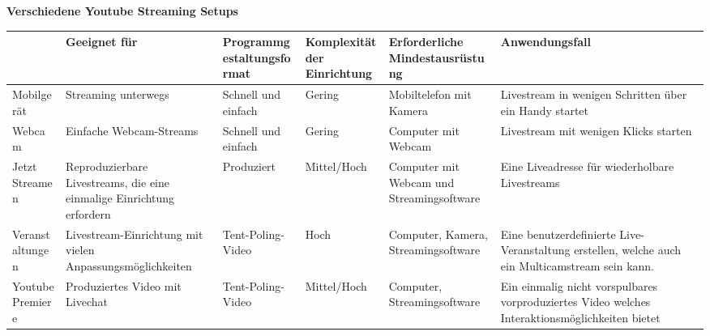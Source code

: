 \newpage
{}
\begin{table}[h]
  \begin{adjustwidth}{-1cm}{-1cm}%
    \begin{center}
      \textbf{Verschiedene Youtube Streaming Setups}
      \begin{tabular}{|p{3cm}|p{3cm}|p{3cm}|p{3cm}|p{3cm}|p{3cm}|}
        \hline
                          &  Geeignet für                                                         & Programmgestaltungsformat & Komplexität der Einrichtung & Erforderliche Mindestausrüstung & Anwendungsfall \\ \hline
        Mobilgerät        & Streaming unterwegs                                                   & Schnell und einfach       & Gering                      & Mobiltelefon mit Kamera & Livestream in wenigen Schritten über ein Handy startet \\ \hline
        Webcam            & Einfache Webcam-Streams                                               & Schnell und einfach       & Gering                      & Computer mit Webcam & Livestream mit wenigen Klicks starten\\ \hline
        Jetzt Streamen    & Reproduzierbare Livestreams, die eine einmalige Einrichtung erfordern & Produziert                & Mittel/Hoch                 & Computer mit Webcam und Streamingsoftware & Eine Liveadresse für wiederholbare Livestreams \\ \hline
        Veranstaltungen   & Livestream-Einrichtung mit vielen Anpassungsmöglichkeiten             & Tent-Poling-Video         & Hoch                        & Computer, Kamera, Streamingsoftware  & Eine benutzerdefinierte Live-Veranstaltung erstellen, welche auch ein Multicamstream sein kann. \\ \hline
        Youtube Premiere  & Produziertes Video mit Livechat                                       & Tent-Poling-Video         & Mittel/Hoch                 & Computer, Streamingsoftware & Ein einmalig nicht vorspulbares vorproduziertes Video welches Interaktionsmöglichkeiten bietet \\ \hline
      \end{tabular}
    \end{center}
  \end{adjustwidth}
\end{table}


















